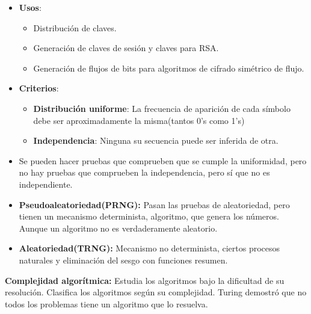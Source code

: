 \documentclass[12pt, twoside, openright]{report} %
\begin{document}
  \begin{itemize}
  \item \textbf{Usos}:
    

    \begin{itemize}
    \item Distribución de claves.
      
    \item Generación de claves de sesión y claves para RSA.
      
    \item Generación de flujos de bits para algoritmos de cifrado simétrico
      de flujo.
      
    \end{itemize}
  \item \textbf{Criterios}:
    

    \begin{itemize}
    \item \textbf{Distribución uniforme}: La frecuencia de aparición de cada
      símbolo debe ser aproximadamente la misma(tantos 0's como 1's)
      
    \item \textbf{Independencia}: Ninguna su secuencia puede ser inferida de
      otra.
      
    \end{itemize}
  \item Se pueden hacer pruebas que comprueben que se cumple la uniformidad,
    pero no hay pruebas que comprueben la independencia, pero sí que no
    es independiente.
    
  \item \textbf{Pseudoaleatoriedad(PRNG):} Pasan las pruebas de
    aleatoriedad, pero tienen un mecanismo determinista, algoritmo, que
    genera los números. Aunque un algoritmo no es verdaderamente
    aleatorio.
    
  \item \textbf{Aleatoriedad(TRNG):} Mecanismo no determinista, ciertos
    procesos naturales y eliminación del sesgo con funciones resumen.
    
  \end{itemize}

  
  \textbf{Complejidad algorítmica:} Estudia los algoritmos bajo la
  dificultad de su resolución. Clasifica los algoritmos según su
  complejidad. Turing demostró que no todos los problemas tiene un
  algoritmo que lo resuelva.
  
\end{document}
